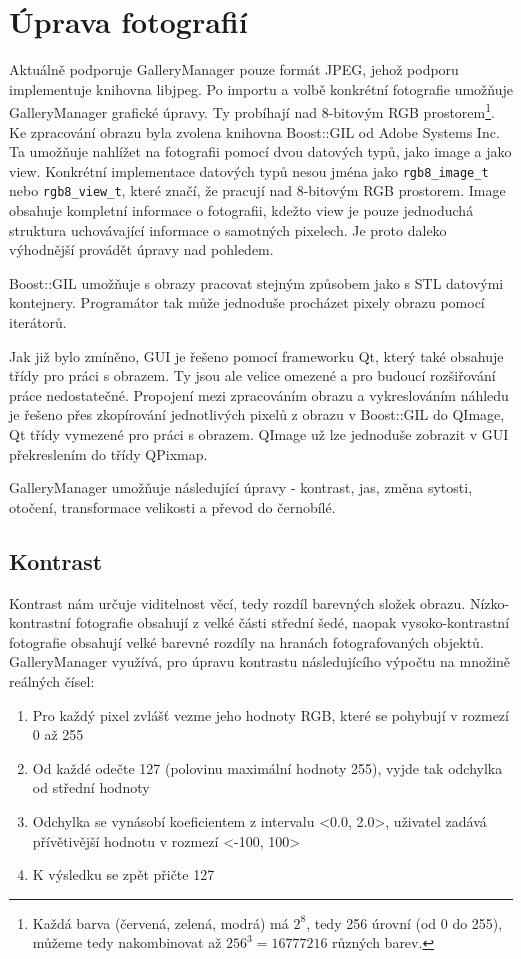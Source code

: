 \documentclass[11pt,twoside,a4paper]{book}
\begin{document}
\section{Úprava fotografií}
\noindent
Aktuálně podporuje GalleryManager pouze formát JPEG, jehož podporu implementuje knihovna libjpeg. Po importu a volbě konkrétní fotografie umožňuje GalleryManager grafické úpravy. Ty probíhají nad 8-bitovým RGB prostorem\footnote{Každá barva (červená, zelená, modrá) má $2^{8}$, tedy 256 úrovní (od 0 do 255), můžeme tedy nakombinovat až $256^{3}=16777216$ různých barev.}. Ke zpracování obrazu byla zvolena knihovna Boost::GIL od Adobe Systems Inc. Ta umožňuje nahlížet na fotografii pomocí dvou datových typů, jako image a jako view. Konkrétní implementace datových typů nesou jména jako \verb|rgb8_image_t| nebo \verb|rgb8_view_t|, které značí, že pracují nad 8-bitovým RGB prostorem. Image obsahuje kompletní informace o fotografii, kdežto view je pouze jednoduchá struktura uchovávající informace o samotných pixelech. Je proto daleko výhodnější provádět úpravy nad pohledem.

\indent
Boost::GIL umožňuje s obrazy pracovat stejným způsobem jako s STL datovými kontejnery. Programátor tak může jednoduše procházet pixely obrazu pomocí iterátorů.

\indent
Jak již bylo zmíněno, GUI je řešeno pomocí frameworku Qt, který také obsahuje třídy pro práci s obrazem. Ty jsou ale velice omezené a pro budoucí rozšiřování práce nedostatečné. Propojení mezi zpracováním obrazu a vykreslováním náhledu je řešeno přes zkopírování jednotlivých pixelů z obrazu v Boost::GIL do QImage, Qt třídy vymezené pro práci s obrazem. QImage už lze jednoduše zobrazit v GUI překreslením do třídy QPixmap.

\indent
GalleryManager umožňuje následující úpravy - kontrast, jas, změna sytosti, otočení, transformace velikosti a převod do černobílé.

\subsection{Kontrast}
\noindent
Kontrast nám určuje viditelnost věcí, tedy rozdíl barevných složek obrazu. Nízko-kontrastní fotografie obsahují z velké části střední šedé, naopak vysoko-kontrastní fotografie obsahují velké barevné rozdíly na hranách fotografovaných objektů. GalleryManager využívá, pro úpravu kontrastu následujícího výpočtu na množině reálných čísel:
\begin{enumerate}
\item Pro každý pixel zvlášť vezme jeho hodnoty RGB, které se pohybují v rozmezí 0 až 255
\item Od každé odečte 127 (polovinu maximální hodnoty 255), vyjde tak odchylka od střední hodnoty
\item Odchylka se vynásobí koeficientem z intervalu <0.0, 2.0>, uživatel zadává přívětivější hodnotu v rozmezí <-100, 100>
\item K výsledku se zpět přičte 127
\end{enumerate}
\end{document}
